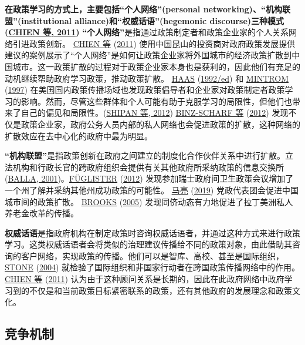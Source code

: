 \documentclass[
  12pt,
]{ctexart}
\begin{document}
\textbf{在政策学习的方式上，主要包括``个人网络''(personal networking)、``机构联盟''(institutional alliance)和``权威话语''(hegemonic discourse)三种模式(\protect\hyperlink{ref-CHIENHo2011}{CHIEN 等, 2011})}
\textbf{``个人网络''}是指通过政策制定者和政策企业家的个人关系网络引进政策创新。
\protect\hyperlink{ref-CHIENHo2011}{CHIEN 等} (\protect\hyperlink{ref-CHIENHo2011}{2011}) 使用中国昆山的投资商对政府政策发展提供建议的案例展示了``个人网络''是如何让政策企业家将外国城市的经济政策扩散到中国城市。这一政策扩散的过程对于政策企业家本身也是获利的，因此他们有充足的动机继续帮助政府学习政策，推动政策扩散。
\protect\hyperlink{ref-Haas1992}{HAAS} (\protect\hyperlink{ref-Haas1992}{1992/ed}) 和 \protect\hyperlink{ref-Mintrom1997}{MINTROM} (\protect\hyperlink{ref-Mintrom1997}{1997}) 在美国国内政策传播场域也发现政策倡导者和企业家对政策制定者政策学习的影响。然而，尽管这些群体和个人可能有助于克服学习的局限性，但他们也带来了自己的偏见和局限性。(\protect\hyperlink{ref-ShipanVolden2012}{SHIPAN 等, 2012})
\protect\hyperlink{ref-Binz-ScharfEtAl2012}{BINZ-SCHARF 等} (\protect\hyperlink{ref-Binz-ScharfEtAl2012}{2012}) 发现不仅是政策企业家，政府公务人员内部的私人网络也会促进政策的扩散，这种网络的扩散效应在去中心化的政府中最为明显。

\textbf{``机构联盟''}是指政策创新在政府之间建立的制度化合作伙伴关系中进行扩散。立法机构和行政长官的跨政府组织会提供有关其他政府所采纳政策的信息交换所(\protect\hyperlink{ref-Balla2001}{BALLA, 2001})。\protect\hyperlink{ref-Fuglister2012}{FÜGLISTER} (\protect\hyperlink{ref-Fuglister2012}{2012}) 发现参加瑞士政府间卫生政策会议增加了一个州了解并采纳其他州成功政策的可能性。 \protect\hyperlink{ref-MaLiang2019}{马亮} (\protect\hyperlink{ref-MaLiang2019}{2019}) 党政代表团会促进中国城市间的政策扩散。 \protect\hyperlink{ref-Brooks2005}{BROOKS} (\protect\hyperlink{ref-Brooks2005}{2005}) 发现同侪动态有力地促进了拉丁美洲私人养老金改革的传播。

\textbf{权威话语}是指政府机构在制定政策时咨询权威话语者，并通过这种方式来进行政策学习。这类权威话语者会将类似的治理建议传播给不同的政策对象，由此借助其咨询的客户网络，实现政策的传播。他们可以是智库、高校、甚至是国际组织，\protect\hyperlink{ref-Stone2004}{STONE} (\protect\hyperlink{ref-Stone2004}{2004}) 就检验了国际组织和非国家行动者在跨国政策传播网络中的作用。\protect\hyperlink{ref-CHIENHo2011}{CHIEN 等} (\protect\hyperlink{ref-CHIENHo2011}{2011}) 认为由于这种顾问关系是长期的，因此在此政府网络中政府学习到的不仅是和当前政策目标紧密联系的政策，还有其他政府的发展理念和政策文化。

\hypertarget{ux7adeux4e89ux673aux5236}{%
\subsection{竞争机制}\label{ux7adeux4e89ux673aux5236}}
\end{document}
